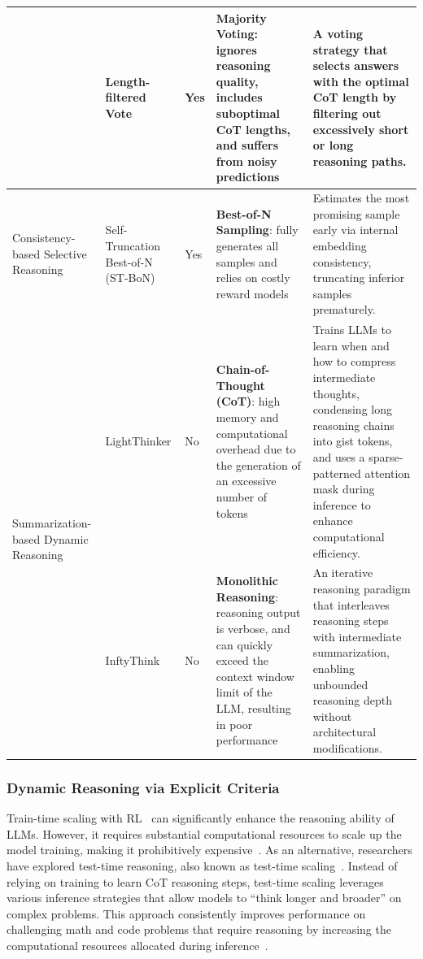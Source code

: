 \begin{table}[htbp]
{\begin{tabular}{p{1.5cm} p{2cm} p{0.8cm} p{3cm} p{4cm}}
  \cmidrule(l){2-5}
  & Length-filtered Vote \cite{wu2025more} & Yes & \textbf{Majority Voting}: ignores reasoning quality, includes suboptimal CoT lengths, and suffers from noisy predictions & A voting strategy that selects answers with the optimal CoT length by filtering out excessively short or long reasoning paths. \\
  \midrule
  Consistency-based Selective Reasoning & Self-Truncation Best-of-N (ST-BoN) \cite{wang2025sampling} & Yes & \textbf{Best-of-N Sampling}: fully generates all samples and relies on costly reward models & Estimates the most promising sample early via internal embedding consistency, truncating inferior samples prematurely. \\
  \midrule
  \multirow{2}{*}{\parbox{1.7cm}{Summarization-based Dynamic Reasoning}} & LightThinker \cite{zhang2025lightthinker} & No & \textbf{Chain-of-Thought (CoT)}: high memory and computational overhead due to the generation of an excessive number of tokens & Trains LLMs to learn when and how to compress intermediate thoughts, condensing long reasoning chains into gist tokens, and uses a sparse-patterned attention mask during inference to enhance computational efficiency. \\
    \cmidrule(l){2-5}
  & InftyThink \cite{yan2025inftythink} & No & \textbf{Monolithic Reasoning}: reasoning output is verbose, and can quickly exceed the context window limit of the LLM, resulting in poor performance & An iterative reasoning paradigm that interleaves reasoning steps with intermediate summarization, enabling unbounded reasoning depth without architectural modifications. \\
\bottomrule
\end{tabular}
}
\end{table}

\subsubsection{Dynamic Reasoning via Explicit Criteria}

Train-time scaling with RL~\cite{guo2025deepseek} can significantly enhance the reasoning ability of LLMs. However, it requires substantial computational resources to scale up the model training, making it prohibitively expensive~\cite{guo2025deepseek}.
As an alternative, researchers have explored test-time reasoning, also known as test-time scaling~\cite{snell2024scaling}. Instead of relying on training to learn CoT reasoning steps, test-time scaling leverages various inference strategies that allow models to ``think longer and broader'' on complex problems. This approach consistently improves performance on challenging math and code problems that require reasoning by increasing the computational resources allocated during inference~\cite{snell2024scaling, beeching2024scalingtesttimecompute}.

